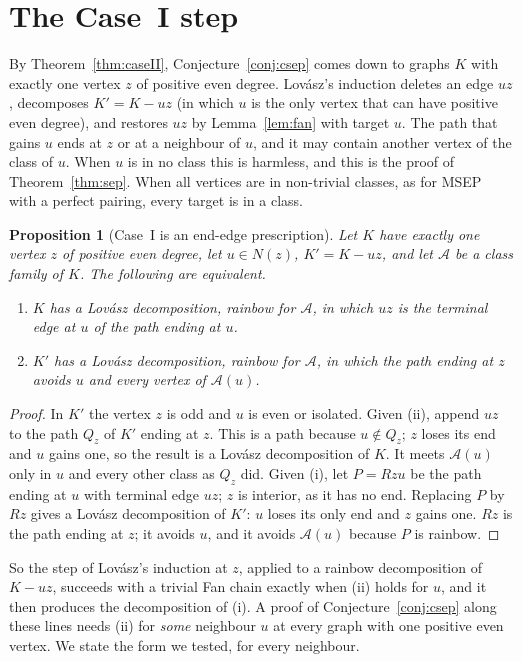 \documentclass[11pt]{amsart}
\newtheorem{proposition}[theorem]{Proposition}
\theoremstyle{definition}
\newcommand{\cA}{\mathcal A}
\begin{document}
\section{The Case~I step}\label{sec:caseI}

By Theorem~\ref{thm:caseII}, Conjecture~\ref{conj:csep} comes down to graphs $K$ with exactly one vertex
$z$ of positive even degree. Lov\'asz's induction deletes an edge $uz$, decomposes $K'=K-uz$ (in which $u$
is the only vertex that can have positive even degree), and restores $uz$ by Lemma~\ref{lem:fan} with target $u$. The path that
gains $u$ ends at $z$ or at a neighbour of $u$, and it may contain another vertex of the class of $u$.
When $u$ is in no class this is harmless, and this is the proof of Theorem~\ref{thm:sep}. When all
vertices are in non-trivial classes, as for MSEP with a perfect pairing, every target is in a class.

\begin{proposition}[Case~I is an end-edge prescription]\label{prop:EE}
Let $K$ have exactly one vertex $z$ of positive even degree, let $u\in N(z)$, $K'=K-uz$, and let $\cA$ be
a class family of $K$. The following are equivalent.
\begin{enumerate}
\item[(i)] $K$ has a Lov\'asz decomposition, rainbow for $\cA$, in which $uz$ is the terminal edge at $u$
of the path ending at $u$.
\item[(ii)] $K'$ has a Lov\'asz decomposition, rainbow for $\cA$, in which the path ending at $z$ avoids
$u$ and every vertex of $\cA(u)$.
\end{enumerate}
\end{proposition}

\begin{proof}
In $K'$ the vertex $z$ is odd and $u$ is even or isolated. Given (ii), append $uz$ to the path $Q_z$ of
$K'$ ending at $z$. This is a path because $u\notin Q_z$; $z$ loses its end and $u$ gains one, so the
result is a Lov\'asz decomposition of $K$. It meets $\cA(u)$ only in $u$ and every other class as $Q_z$
did. Given (i), let $P=Rzu$ be the path ending at $u$ with terminal edge $uz$; $z$ is interior, as it
has no end. Replacing $P$ by $Rz$ gives a Lov\'asz decomposition of $K'$: $u$ loses its only end and $z$
gains one. $Rz$ is the path ending at $z$; it avoids $u$, and it avoids $\cA(u)$ because $P$ is rainbow.
\end{proof}

So the step of Lov\'asz's induction at $z$, applied to a rainbow decomposition of $K-uz$, succeeds with a
trivial Fan chain exactly when (ii) holds for $u$, and it then produces the decomposition of (i). A proof
of Conjecture~\ref{conj:csep} along these lines needs (ii) for \emph{some} neighbour $u$ at every graph
with one positive even vertex. We state the form we tested, for every neighbour.
\end{document}
